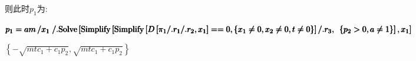\documentclass[paper=a4, fontsize=10.5pt]{scrartcl} %
\numberwithin{equation}{section} %
\numberwithin{figure}{section} %
\numberwithin{table}{section} %
\begin{document}
\begin{CJK}{UTF8}{gbsn}
则此时$p_1$为:

\(\pmb{p_1 = }
	\pmb{a m \left/x_1\right. \text{/.} }
	\pmb{\text{Solve}\left[\text{Simplify}\left[\text{Simplify}\left[D\left[\pi _1 \text{/.} r_1 \text{/.}r_2,x_1\right]==0,\left\{x_1\neq 0,x_2\neq
		0,t\neq 0\right\}\right]\text{/.}r_3,\right.\right.}
	\pmb{\left.\left.\left\{p_2>0,a\neq 1\right\}\right],x_1\right]}\)


\(\left\{-\sqrt{m t c_1+c_1 p_2},\sqrt{m t c_1+c_1 p_2}\right\}\)


\end{CJK}
\end{document}
